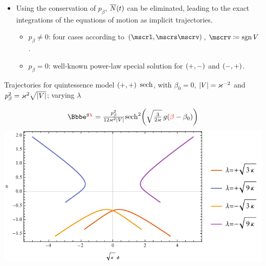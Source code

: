 \documentclass[8pt]{beamer}
\begin{document}
\begin{frame}
\begin{itemize}
\item Using the \alert{conservation of $p_\beta$}, ${\overline{N}}\mathopen{}\left(t\right)\mathclose{}$ can be eliminated, 
leading to the exact integrations of the equations of motion as \alert{implicit 
trajectories}.
\begin{itemize}
\item $p_\beta \neq 0$: four cases according to $\rbr{\mscrl, \mscrs \mscrv}$,
\textcolor{blue}{$\mscrv \coloneqq \sgn V$}.
\item $p_\beta = 0$: well-known power-law special solution for ${\left(+,-\right)}$ 
and ${\left(-,+\right)}$.
\end{itemize}

\end{itemize}
\end{frame}


\begin{frame}%
{Trajectories for quintessence model ${\left(+,+\right)}$}%
{$\operatorname{sech}$, with $\beta_0 = 0$, ${\left|V\right|} = \varkappa^{-2}$ and
$p_\beta^2 = \varkappa^2\sqrt{{\left|V\right|}}$; varying $\lambda$}

\begin{align}
\ee^{g\textcolor{red}{\chi}} = 
\tfrac{p_\beta^2}{12\varkappa^2\vbr{V}}
\rfun{\sech^2}{ \sqrt{\tfrac{3}{2\varkappa}}\,g 
\rbr{\textcolor{red}{\beta}-\beta_0}}
\end{align}
\includegraphics[width=\textwidth]{../plots.nb/sech_lamb.pdf}

\end{frame}
\end{document}
